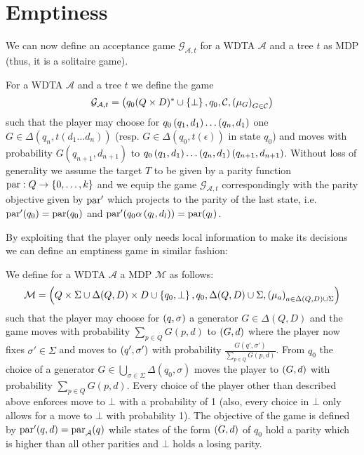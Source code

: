\section{Emptiness}
We can now define an acceptance game $\mathcal{G}_{\mathcal{A}, t}$ for a
\ac{WDTA} $\mathcal{A}$ and a tree $t$ as \ac{MDP} (thus, it is a solitaire
game).
\begin{definition}
  For a \ac{WDTA} $\mathcal{A}$ and a tree $t$ we define the game
  \begin{equation}
    \mathcal{G}_{\mathcal{A}, t} = \left(q_{0}(Q\times D)^{*}\cup\left\{\bot\right\},
    q_{0}, \mathcal{C}, \left(\mu_{G}\right)_{G\in\mathcal{C}}\right)
  \end{equation}
  such that the player may choose for
  $q_{0}\left(q_{1}, d_{1}\right)\dots\left(q_{n}, d_{1}\right)$ one
  $G\in\Delta(q_{n}, t(d_{1}\dots d_{n}))$ (resp.
  $G\in\Delta(q_{0}, t(\epsilon))$ in state $q_{0}$)
  and moves with probability $G(q_{n+1}, d_{n+1})$ to
  $q_{0}\left(q_{1}, d_{1}\right)\dots\left(q_{n}, d_{1}\right)\left(q_{n+1}, d_{n+1}\right)$.
  Without loss of generality we assume the target $T$ to be given by a parity
  function $\operatorname{par}:Q\rightarrow \left\{0,\dots, k\right\}$ and we equip the game
  $\mathcal{G}_{\mathcal{A}, t}$ correspondingly with the parity objective given
  by $\operatorname{par}'$ which projects to the parity of the last state, i.e.
  $\operatorname{par}'(q_0) = \operatorname{par}(q_0)$ and $\operatorname{par}'(q_0\alpha\left(q_{l}, d_{l}\right)) = \operatorname{par}(q_{l})$.
\end{definition}
By exploiting that the player only needs local information to make its
decisions we can define an emptiness game in similar fashion:
\begin{definition}
  We define for a \ac{WDTA} $\mathcal{A}$ a \ac{MDP} $\mathcal{M}$ as follows:
  \begin{equation}
    \mathcal{M} = \left(Q\times\Sigma\cup\Delta(Q, D)\times D\cup\left\{q_{0},\bot\right\},
    q_{0}, \Delta(Q, D)\cup\Sigma, \left(\mu_a\right)_{a\in\Delta(Q, D)\cup\Sigma}\right)
  \end{equation}
  such that the player may choose for $\left(q,\sigma\right)$ a generator
  $G\in\Delta(Q, D)$ and the game moves with probability
  $\sum\limits_{p\in Q}G(p, d)$ to $\left(G, d\right)$ where the player now fixes
  $\sigma'\in\Sigma$ and moves to $\left(q', \sigma'\right)$ with probability
  $\frac{G(q',\sigma')}{\sum\limits_{p\in Q}G(p, d)}$. From $q_{0}$ the choice
  of a generator $G\in\bigcup\limits_{\sigma\in\Sigma}\Delta(q_{0}, \sigma)$
  moves the player to $\left(G, d\right)$ with probability
  $\sum\limits_{p\in Q}G(p, d)$.
  Every choice of the player other than described above enforces move to $\bot$
  with a probability of 1 (also, every choice in $\bot$ only allows
  for a move to $\bot$ with probability 1). The objective of the game is
  defined by $\operatorname{par}'(q,d) = \operatorname{par}_{\mathcal{A}}(q)$ while states of the
  form $\left(G, d\right)$ of $q_{0}$ hold a parity which is higher than all other
  parities and $\bot$ holds a losing parity. 
\end{definition}
